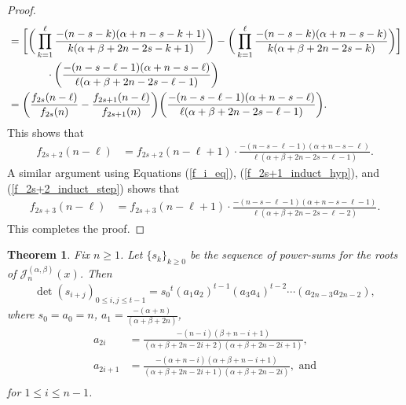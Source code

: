 \documentclass{amsart}
\theoremstyle{plain}
\newtheorem{thm}[equation]{Theorem}
\theoremstyle{remark}
\begin{document}
\begin{proof}
\begin{align}
&=\bigg[\bigg(\prod_{k=1}^\ell\frac{-(n-s-k)(\alpha+n-s-k+1)}{k(\alpha+\beta+2n-2s-k+1)}\bigg)-\bigg(\prod_{k=1}^\ell\frac{-(n-s-k)(\alpha+n-s-k)}{k(\alpha+\beta+2n-2s-k)}\bigg)\bigg] \notag 
\\&\hspace{0.5in}\cdot\bigg(\frac{-(n-s-\ell-1)(\alpha+n-s-\ell)}{\ell(\alpha+\beta+2n-2s-\ell-1)}\bigg)\notag \\
&=\bigg(\frac{f_{2s}(n-\ell)}{f_{2s}(n)}-\frac{f_{2s+1}(n-\ell)}{f_{2s+1}(n)}\bigg)\bigg(\frac{-(n-s-\ell-1)(\alpha+n-s-\ell)}{\ell(\alpha+\beta+2n-2s-\ell-1)}\bigg). \notag
\end{align}
This shows that 
\begin{align}
f_{2s+2}(n-\ell)&=f_{2s+2}(n-\ell+1)\cdot\frac{-(n-s-\ell-1)(\alpha+n-s-\ell)}{\ell(\alpha+\beta+2n-2s-\ell-1)}. \label{f_2s+2_induct_step}
\end{align}
A similar argument using Equations (\ref{f_i_eq}), (\ref{f_2s+1_induct_hyp}), and (\ref{f_2s+2_induct_step}) shows that
\begin{align}
f_{2s+3}(n-\ell)
&=f_{2s+3}(n-\ell+1)\cdot\frac{-(n-s-\ell-1)(\alpha+n-s-\ell-1)}{\ell(\alpha+\beta+2n-2s-\ell-2)}. \label{f_2s+3_induct_step}
\end{align}
This completes the proof.
\end{proof}

\begin{thm} \label{elis_version}
Fix $n \geq 1$.  Let $\{s_k\}_{k\geq 0}$ be the sequence of power-sums for the roots of  $\mathscr{J}_n^{(\alpha,\beta)}(x)$.  Then 
\begin{gather*}
    \det(s_{i+j})_{0\le i,j\le t-1}={s_0}^t(a_1a_2)^{t-1}
   (a_3a_4)^{t-2}\cdots(a_{2n-3}a_{2n-2}),
\end{gather*}
where $s_0 = a_0=n$, ${a_1=\frac{-(\alpha+n)}{(\alpha+\beta+2n)}}$, 
\begin{align*}
    a_{2i}&=\frac{-(n-i)(\beta+n-i+1)}{(\alpha+\beta+2n-2i+2)(\alpha+\beta+2n-2i+1)}, \\
    a_{2i+1}&=\frac{-(\alpha+n-i)(\alpha+\beta+n-i+1)}{(\alpha+\beta+2n-2i+1)(\alpha+\beta+2n-2i)},\text{ and}\\
\end{align*}
for  $1\le i\le n-1$.
\end{thm}
\end{document}
